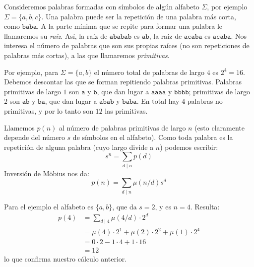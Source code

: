   Consideremos palabras formadas
  con símbolos de algún alfabeto \(\Sigma\),
  por ejemplo \(\Sigma = \{a, b, c\}\).%
  Una palabra puede ser la repetición de una palabra más corta,
  como \(\mathtt{baba}\).
  A la parte mínima que se repite para formar una palabra
  le llamaremos su \emph{raíz}.%
  Así,
  la raíz de \(\mathtt{ababab}\) es \(\mathtt{ab}\),
  la raíz de \(\mathtt{acaba}\) es \(\mathtt{acaba}\).
  Nos interesa el número de palabras que son sus propias raíces
  (no son repeticiones de palabras más cortas),
  a las que llamaremos \emph{primitivas}.%

  Por ejemplo,
  para \(\Sigma = \{ a, b \}\)
  el número total de palabras de largo \(4\) es \(2^4 = 16\).
  Debemos descontar
  las que se forman repitiendo palabras primitivas.
  Palabras primitivas de largo \(1\)
  son \(\mathtt{a}\) y \(\mathtt{b}\),
  que dan lugar a \(\mathtt{aaaa}\) y \(\mathtt{bbbb}\);
  primitivas de largo \(2\) son \(\mathtt{ab}\) y \(\mathtt{ba}\),
  que dan lugar a \(\mathtt{abab}\) y \(\mathtt{baba}\).
  En total hay \(4\) palabras no primitivas,
  y por lo tanto son \(12\) las primitivas.

  Llamemos \(p(n)\)
  al número de palabras primitivas de largo \(n\)
  (esto claramente depende del número \(s\)
   de símbolos en el alfabeto).
  Como toda palabra es la repetición de alguna palabra
  (cuyo largo divide a \(n\))
  podemos escribir:
  \begin{equation*}
    s^n
      = \sum_{d \mid n} p(d)
  \end{equation*}
  Inversión de Möbius%
  nos da:
  \begin{equation*}
    p(n)
      = \sum_{d \mid n} \mu(n / d) s^d
  \end{equation*}

  Para el ejemplo el alfabeto es \(\{ a, b \}\),
  que da \(s = 2\),
  y es \(n = 4\).
  Resulta:
  \begin{align*}
    p(4)
      &= \sum_{d \mid 4} \mu(4 / d) \cdot 2^d \\
      &= \mu(4) \cdot 2^1 + \mu(2) \cdot 2^2 + \mu(1) \cdot 2^4 \\
      &= 0 \cdot 2 - 1 \cdot 4 + 1 \cdot 16 \\
      &= 12
  \end{align*}
  lo que confirma nuestro cálculo anterior.

